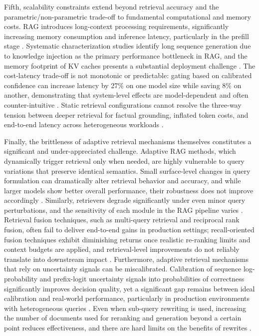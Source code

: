 \documentclass[11pt]{article}
\begin{document}
Fifth, scalability constraints extend beyond retrieval accuracy and the parametric/non-parametric trade-off to fundamental computational and memory costs. RAG introduces long-context processing requirements, significantly increasing memory consumption and inference latency, particularly in the prefill stage \cite{ref523,ref510}. Systematic characterization studies identify long sequence generation due to knowledge injection as the primary performance bottleneck in RAG, and the memory footprint of KV caches presents a substantial deployment challenge \cite{ref510}. The cost-latency trade-off is not monotonic or predictable: gating based on calibrated confidence can increase latency by 27\% on one model size while saving 8\% on another, demonstrating that system-level effects are model-dependent and often counter-intuitive \cite{ref604}. Static retrieval configurations cannot resolve the three-way tension between deeper retrieval for factual grounding, inflated token costs, and end-to-end latency across heterogeneous workloads \cite{ref605}.

Finally, the brittleness of adaptive retrieval mechanisms themselves constitutes a significant and under-appreciated challenge. Adaptive RAG methods, which dynamically trigger retrieval only when needed, are highly vulnerable to query variations that preserve identical semantics. Small surface-level changes in query formulation can dramatically alter retrieval behavior and accuracy, and while larger models show better overall performance, their robustness does not improve accordingly \cite{ref66}. Similarly, retrievers degrade significantly under even minor query perturbations, and the sensitivity of each module in the RAG pipeline varies \cite{ref606}. Retrieval fusion techniques, such as multi-query retrieval and reciprocal rank fusion, often fail to deliver end-to-end gains in production settings; recall-oriented fusion techniques exhibit diminishing returns once realistic re-ranking limits and context budgets are applied, and retrieval-level improvements do not reliably translate into downstream impact \cite{ref607}. Furthermore, adaptive retrieval mechanisms that rely on uncertainty signals can be miscalibrated. Calibration of sequence log-probability and prefix-logit uncertainty signals into probabilities of correctness significantly improves decision quality, yet a significant gap remains between ideal calibration and real-world performance, particularly in production environments with heterogeneous queries \cite{ref604}. Even when sub-query rewriting is used, increasing the number of documents used for reranking and generation beyond a certain point reduces effectiveness, and there are hard limits on the benefits of rewrites \cite{ref608}.
\end{document}

